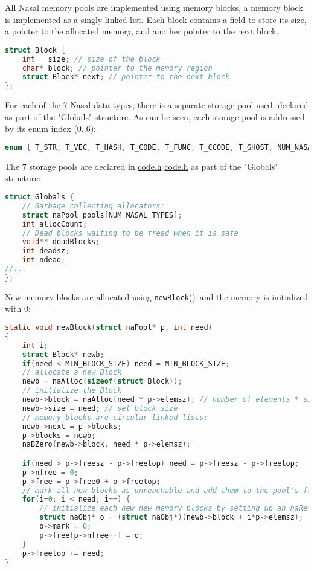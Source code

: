 \documentclass{article}
\newcommand{\func}[1]{\textcolor{func}{\tt #1}}
\newcommand{\nasalsourcefile}[2][]{%
  \ifthenelse{\isempty{#1}}%
    {%
      \textcolor{source}{%
        \href{https://github.com/andyross/nasal/blob/master/src/#2}{#2}%
      }%
    }%
    {%
      \textcolor{source}{%
        \href{https://github.com/andyross/nasal/blob/master/src/#2\#L#1}{#2}%
      }%
    }%
}
\newcommand{\nasalapi}[1]{\func{#1}}
\newcommand{\fp}{\textcolor{func}{()}}
\begin{document}
All Nasal memory pools are implemented using memory blocks, a memory block is implemented as a singly linked list.  Each block contains a field to store its size, a pointer to the allocated memory, and another pointer to the next block.

\begin{lstlisting}[language=C]
struct Block {
    int   size; // size of the block 
    char* block; // pointer to the memory region
    struct Block* next;	// pointer to the next block
};
\end{lstlisting}

For each of the 7 Nasal data types, there is a separate storage pool used, declared as part of the "Globals" structure.  As can be seen, each storage pool is addressed by its enum index (0..6):
\begin{lstlisting}[language=C]
enum { T_STR, T_VEC, T_HASH, T_CODE, T_FUNC, T_CCODE, T_GHOST, NUM_NASAL_TYPES };
\end{lstlisting}

The 7 storage pools are declared in \nasalsourcefile{code.h} as part of the "Globals" structure:

\begin{lstlisting}[language=C]
struct Globals {	
    // Garbage collecting allocators:
    struct naPool pools[NUM_NASAL_TYPES];
    int allocCount;
    // Dead blocks waiting to be freed when it is safe
    void** deadBlocks;
    int deadsz;
    int ndead;
//...
};
\end{lstlisting}

New memory blocks are allocated using \nasalapi{newBlock}\fp\ and the memory is initialized with 0:

\begin{lstlisting}[language=C]
static void newBlock(struct naPool* p, int need)
{
    int i;
    struct Block* newb;
    if(need < MIN_BLOCK_SIZE) need = MIN_BLOCK_SIZE;
    // allocate a new Block
    newb = naAlloc(sizeof(struct Block));
    // initialize the Block
    newb->block = naAlloc(need * p->elemsz); // number of elements * size of element
    newb->size = need; // set block size 
    // memory blocks are circular linked lists: 
    newb->next = p->blocks;
    p->blocks = newb;
    naBZero(newb->block, need * p->elemsz);

    if(need > p->freesz - p->freetop) need = p->freesz - p->freetop;
    p->nfree = 0;
    p->free = p->free0 + p->freetop;
    // mark all new blocks as unreachable and add them to the pool's free list
    for(i=0; i < need; i++) {
        // initialize each new new memory blocks by setting up an naRef (the container for all Nasal references) 
        struct naObj* o = (struct naObj*)(newb->block + i*p->elemsz);
        o->mark = 0;
        p->free[p->nfree++] = o;
    }
    p->freetop += need;
}
\end{lstlisting}
\end{document}
